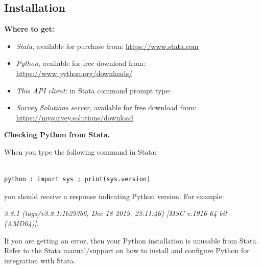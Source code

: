 \vskip16pt
\subsection{Installation}
\par
\vskip16pt
\textbf{Where to get:}\par
\begin{itemize}

  \item \textit{Stata}, available for purchase from: \newline
  \href{https://www.stata.com}{https://www.stata.com}

  \item \textit{Python}, available for free download from: \newline
  \href{https://www.python.org/downloads/}{https://www.python.org/downloads/}

  \item \textit{This API client:} in Stata command prompt type: \newline

  \item \textit{Survey Solutions server}, available for free download from: \newline
  \href{https://mysurvey.solutions/download}{https://mysurvey.solutions/download}
\end{itemize}

\vskip16pt
\textbf{Checking Python from Stata.}\par
\vskip16pt
When you type the following command in Stata:\par
\vskip16pt
\begin{lstlisting}[style=CommandLineStyle, showlines=true]

python : import sys ; print(sys.version)

\end{lstlisting}
\vskip16pt
you should receive a response indicating Python version. For example: \par
\vskip16pt
\textit{3.8.1 (tags/v3.8.1:1b293b6, Dec 18 2019, 23:11:46) [MSC v.1916 64 bit (AMD64)]}.\par
\vskip16pt
If you are getting an error, then your Python installation is unusable from Stata. Refer to the Stata manual/support on how to install and configure Python for integration with Stata.


\vskip16pt
